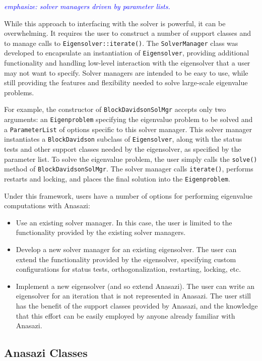 \documentclass[acmtoms]{acmtrans2m}
\newcommand{\aspace}[1]{\texttt{#1}}
\newcommand{\cbcomm}[1]{\textcolor{blue}{\emph{#1}}}
\begin{document}
\cbcomm{emphasize: solver managers driven by parameter lists.}

While this approach to interfacing with the solver is powerful, it can be overwhelming. It
requires the user to construct a number of support classes and to manage calls to
\verb!Eigensolver::iterate()!. The \aspace{SolverManager} class was developed to
encapsulate an instantiation of \aspace{Eigensolver}, providing additional functionality
and handling low-level interaction with the eigensolver that a user may not want to
specify. Solver managers are intended to be easy to use, while still providing the
features and flexibility needed to solve large-scale eigenvalue problems.

For example, the constructor of \aspace{BlockDavidsonSolMgr} accepts only two arguments:
an \aspace{Eigenproblem} specifying the eigenvalue problem to be solved and a
\texttt{ParameterList} of options specific to this solver manager. This solver manager
instantiates a \aspace{BlockDavidson} subclass of \aspace{Eigensolver}, along with the
status tests and other support classes needed by the eigensolver, as
specified by the parameter list. To solve the eigenvalue
problem, the user simply calls the \verb!solve()! method of \aspace{BlockDavidsonSolMgr}.
The solver manager calls \verb!iterate()!, performs restarts and locking, and places the
final solution into the \aspace{Eigenproblem}.

Under this framework, users have a number of options for performing eigenvalue
computations with Anasazi:
\begin{itemize}
\item
Use an existing solver manager. In this case, the user is limited to
the functionality provided by the existing solver managers.
\item
Develop a new solver manager for an existing eigensolver.
The user can extend the functionality provided by the eigensolver,
specifying custom configurations for status tests,
orthogonalization, restarting, locking,  etc.
\item
Implement a new eigensolver (and so extend Anasazi). The user can
write an eigensolver for an iteration that is not represented in
Anasazi. The user still has the benefit of the support classes
provided by Anasazi, and the knowledge that this effort can be
easily employed by anyone already familiar with Anasazi.
\end{itemize}


\subsection{Anasazi Classes}
\label{subsec:anasazi:classes}
\end{document}
